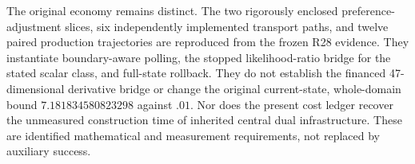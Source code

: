 The original economy remains distinct. The two rigorously enclosed preference-adjustment slices, six independently implemented transport paths, and twelve paired production trajectories are reproduced from the frozen R28 evidence. They instantiate boundary-aware polling, the stopped likelihood-ratio bridge for the stated scalar class, and full-state rollback. They do not establish the financed 47-dimensional derivative bridge or change the original current-state, whole-domain bound $7.181834580823298$ against $.01$. Nor does the present cost ledger recover the unmeasured construction time of inherited central dual infrastructure. These are identified mathematical and measurement requirements, not replaced by auxiliary success.
